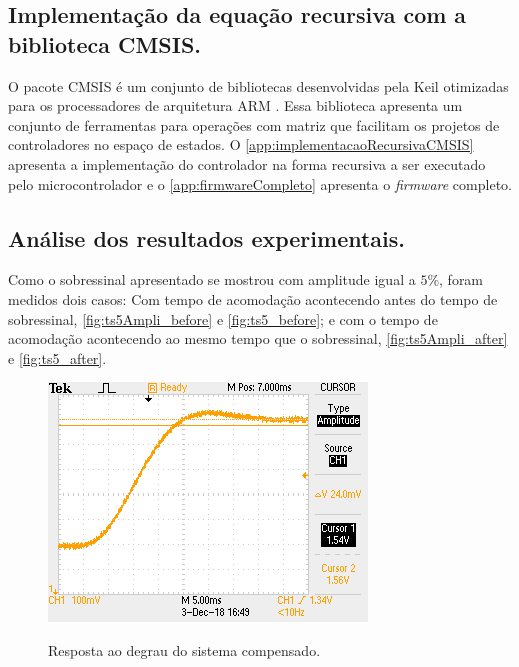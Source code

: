 \documentclass[
	article,			%
	11pt,				%
	oneside,			%
	a4paper,			%
	english,			%
	brazil,				%
	sumario=tradicional
	]{abntex2}
\begin{document}
\pagebreak

\subsection{Implementação da equação recursiva com a biblioteca CMSIS.}

O pacote CMSIS é um conjunto de bibliotecas desenvolvidas pela Keil otimizadas para os processadores de arquitetura ARM \cite{CMSISDSPReference}.
Essa biblioteca apresenta um conjunto de ferramentas para operações com matriz que facilitam os projetos de controladores no espaço de estados.
O \autoref{app:implementacaoRecursivaCMSIS} apresenta a implementação do controlador na forma recursiva a ser executado pelo microcontrolador e o \autoref{app:firmwareCompleto} apresenta o \textit{firmware} completo.


\pagebreak

\subsection{Análise dos resultados experimentais.}

Como o sobressinal apresentado se mostrou com amplitude igual a $5\%$, foram medidos dois casos: Com tempo de acomodação acontecendo antes do tempo de sobressinal, \autoref{fig:ts5Ampli_before} e \autoref{fig:ts5_before}; e com o tempo de acomodação acontecendo ao mesmo tempo que o sobressinal, \autoref{fig:ts5Ampli_after} e \autoref{fig:ts5_after}.

\begin{figure}[htb!]
	\centering
	\caption{Resposta ao degrau do sistema compensado.}
	\includegraphics[scale=1.2]{./img/ts5Ampli_before.png}
	\label{fig:ts5Ampli_before}
\end{figure}
\end{document}
